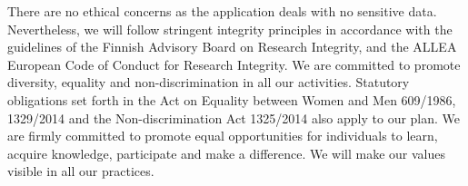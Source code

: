 \documentclass[a4paper,12pt]{article}
\newcommand{\instructions}[1]{\textcolor{blue}{#1}}
\begin{document}
%

There are no ethical concerns as the application deals with no sensitive data.
Nevertheless, we will follow stringent integrity principles in accordance with
the guidelines of the Finnish Advisory Board on Research Integrity, and the
ALLEA European Code of Conduct for Research Integrity.  We are committed to
promote diversity, equality and non-discrimination in all our activities.
Statutory obligations set forth in the Act on Equality between Women and Men
609/1986, 1329/2014 and the Non-discrimination Act 1325/2014 also apply to our
plan. We are ﬁrmly committed to promote equal opportunities for individuals to
learn, acquire knowledge, participate and make a diﬀerence. We will make our
values visible in all our practices.
\end{document}
